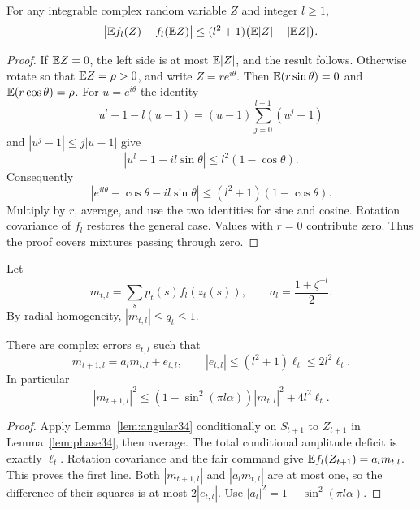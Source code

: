 \begin{lemma}\label{lem:angular34}
For any integrable complex random variable $Z$ and integer $l\ge1$,
\begin{equation}\label{eq:angular-bound34}
 \bigl|\mathbb E f_l(Z)-f_l(\mathbb E Z)\bigr|
           \le(l^2+1)\bigl(\mathbb E|Z|-|\mathbb E Z|\bigr).
\end{equation}
\end{lemma}
\begin{proof}
If $\mathbb E Z=0$, the left side is at most $\mathbb E|Z|$, and the result follows.
Otherwise rotate so that $\mathbb E Z=\rho>0$, and write $Z=re^{i\theta}$.
Then $\mathbb E(r\sin\theta)=0$ and $\mathbb E(r\cos\theta)=\rho$.
For $u=e^{i\theta}$ the identity
\[
 u^l-1-l(u-1)=(u-1)\sum_{j=0}^{l-1}(u^j-1)
\]
and $|u^j-1|\le j|u-1|$ give
\[
 |u^l-1-il\sin\theta|\le l^2(1-\cos\theta).
\]
Consequently
\[
 |e^{il\theta}-\cos\theta-il\sin\theta|
                       \le(l^2+1)(1-\cos\theta).
\]
Multiply by $r$, average, and use the two identities for sine and cosine.
Rotation covariance of $f_l$ restores the general case. Values with $r=0$
contribute zero. Thus the proof covers mixtures passing through zero.
\end{proof}

Let
\begin{equation}\label{eq:moments34}
 m_{t,l}=\sum_s p_t(s)f_l(z_t(s)),\qquad
 a_l=\frac{1+\zeta^{-l}}2.
\end{equation}
By radial homogeneity, $|m_{t,l}|\le q_t\le1$.

\begin{lemma}\label{lem:moments34}
There are complex errors $e_{t,l}$ such that
\begin{equation}\label{eq:moment-recursion34}
 m_{t+1,l}=a_lm_{t,l}+e_{t,l},\qquad
 |e_{t,l}|\le(l^2+1)\ell_t\le2l^2\ell_t.
\end{equation}
In particular
\begin{equation}\label{eq:squared-recursion34}
 |m_{t+1,l}|^2\le
 (1-\sin^2(\pi l\alpha))|m_{t,l}|^2+4l^2\ell_t.
\end{equation}
\end{lemma}
\begin{proof}
Apply Lemma~\ref{lem:angular34} conditionally on $S_{t+1}$ to
$Z_{t+1}$ in Lemma~\ref{lem:phase34}, then average. The total conditional
amplitude deficit is exactly $\ell_t$. Rotation covariance and the fair
command give $\mathbb E f_l(Z_{t+1})=a_lm_{t,l}$. This proves the first line.
Both $|m_{t+1,l}|$ and $|a_lm_{t,l}|$ are at most one, so the difference
of their squares is at most $2|e_{t,l}|$. Use
$|a_l|^2=1-\sin^2(\pi l\alpha)$.
\end{proof}

